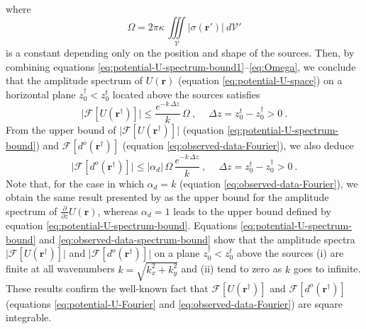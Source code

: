 \documentclass[manuscript,noblind]{geophysics}
\begin{document}
	where
	\begin{equation}
		\Omega = 2 \pi \kappa \, \iiint\limits_{\mathcal{V}}
		\vert \sigma(\mathbf{r}') \vert 
		\: d\mathcal{V}'
		\label{eq:Omega}
	\end{equation}
	is a constant depending only on the position and shape of the sources. 
	Then, by combining equations 
	\ref{eq:potential-U-spectrum-bound1}--\ref{eq:Omega},
	we conclude that the amplitude spectrum of 
	$U(\mathbf{r})$ (equation \ref{eq:potential-U-space}) on a horizontal plane 
	$z^{\dagger}_{0} < z^{t}_{0}$ located above the sources satisfies 
	\begin{equation}
		\vert \mathcal{F} [ U(\mathbf{r}^{\dagger}) ] \vert \le
		\frac{e^{- k \, \Delta z}}{k} \, \Omega \: ,
		\: \quad \Delta z = z^{t}_{0} - z^{\dagger}_{0} > 0 \: .
		\label{eq:potential-U-spectrum-bound}
	\end{equation}
	From the upper bound of $\vert \mathcal{F} [ U(\mathbf{r}^{\dagger}) ] \vert$
	(equation \ref{eq:potential-U-spectrum-bound}) and $\mathcal{F} [ d^{o}(\mathbf{r}^{\dagger}) ]$
	(equation \ref{eq:observed-data-Fourier}), we also deduce
	\begin{equation}
		\vert \mathcal{F} [ d^{o}(\mathbf{r}^{\dagger}) ] \vert \le
		\vert \alpha_{d} \vert \, \Omega \, 
		\frac{e^{- k \, \Delta z}}{k} \: ,
		\: \quad \Delta z = z^{t}_{0} - z^{\dagger}_{0} > 0 \: .
		\label{eq:observed-data-spectrum-bound}
	\end{equation}
	Note that, for the case in which $\alpha_{d} = k$ (equation \ref{eq:observed-data-Fourier}), 
	we obtain the same result presented by \citet{bhattacharyya1967} as the upper bound for the 
	amplitude spectrum of $\tfrac{\partial}{\partial z} U(\mathbf{r})$, whereas
	$\alpha_{d} = 1$ leads to the upper bound defined by equation \ref{eq:potential-U-spectrum-bound}.
	Equations \ref{eq:potential-U-spectrum-bound} and \ref{eq:observed-data-spectrum-bound} 
	show that the amplitude spectra 
	$\vert \mathcal{F} [ U(\mathbf{r}^{\dagger}) ] \vert$ and 
	$\vert \mathcal{F} [ d^{o}(\mathbf{r}^{\dagger}) ] \vert$ on a plane $z^{\dagger}_{0} < z^{t}_{0}$ 
	above the sources 
	(i) are finite at all wavenumbers $k = \sqrt{k_{x}^{2} + k_{y}^{2}}$ and (ii) tend
	to zero as $k$ goes to infinite.
	These results confirm the well-known fact that 
	$\mathcal{F} [ U(\mathbf{r}^{\dagger}) ]$ and $\mathcal{F} [ d^{o}(\mathbf{r}^{\dagger}) ]$ 
	(equations \ref{eq:potential-U-Fourier} and \ref{eq:observed-data-Fourier}) are square integrable.
	
	\label{app:potential-U-min-phase}
	
\end{document}

